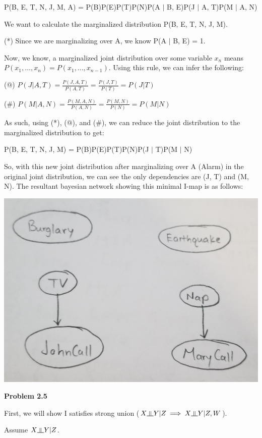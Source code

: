 \documentclass[12pt]{article}
\newcommand{\indep}{\rotatebox[origin=c]{90}{$\models$}}
\begin{document}
P(B, E, T, N, J, M, A) = P(B)P(E)P(T)P(N)P(A $\vert$ B, E)P(J $\vert$ A, T)P(M $\vert$ A, N)

We want to calculate the marginalized distribution P(B, E, T, N, J, M).

(*) Since we are marginalizing over A, we know P(A $\vert$ B, E) = 1.

Now, we know, a marginalized joint distribution over some variable $x_n$ means $P(x_1, \dots, x_n) = P(x_1, \dots, x_{n-1})$. Using this rule, we can infer the following:

(@) $P(J \vert A, T) = \frac{P(J, A, T)}{P(A, T)} = \frac{P(J, T)}{P(T)} = P(J \vert T)$

(\#) $P(M \vert A, N) = \frac{P(M, A, N)}{P(A, N)} = \frac{P(M, N)}{P(N)} = P(M \vert N)$

As such, using (*), (@), and (\#), we can reduce the joint distribution to the marginalized distribution to get:

P(B, E, T, N, J, M) = P(B)P(E)P(T)P(N)P(J $\vert$ T)P(M $\vert$ N)

So, with this new joint distribution after marginalizing over A (Alarm) in the original joint distribution, we can see the only dependencies are (J, T) and (M, N). The resultant bayesian network showing this minimal I-map is as follows:

\includegraphics[scale=0.2]{q2-sub3}

\pagebreak\textbf{Problem 2.5}

First, we will show I satisfies strong union ($X \indep Y \vert Z \implies X \indep Y \vert Z, W$).

Assume $X \indep Y \vert Z$.
\end{document}
